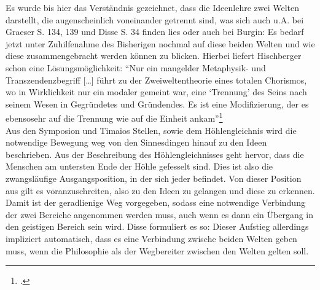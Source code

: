 Es wurde bis hier das Verständnis gezeichnet, dass die Ideenlehre zwei Welten darstellt, die augenscheinlich voneinander getrennt sind, was sich auch u.A. bei Graeser S. 134, 139 und Disse S. 34 finden lies oder auch bei Burgin: 
Es bedarf jetzt unter Zuhilfenahme des Bisherigen nochmal auf diese beiden Welten und wie diese zusammengebracht werden können zu blicken.
Hierbei liefert Hischberger schon eine Lösungsmöglichkeit:
\enquote{Nur ein mangelder Metaphysik- und Transzendenzbegriff [\dots] führt zu der Zweiweltentheorie eines totalen Chorismos, wo in Wirklichkeit nur ein modaler gemeint war, eine \enquote{Trennung} des Seins nach seinem Wesen in Gegründetes und Gründendes. Es ist eine Modifizierung, der es ebensosehr auf die Trennung wie auf die Einheit ankam}\footcite[][S. 96]{Hirschberger}\\
Aus den Symposion und Timaios Stellen, sowie dem Höhlengleichnis wird die notwendige Bewegung weg von den Sinnesdingen hinauf zu den Ideen beschrieben. Aus der Beschreibung des Höhlengleichnisses geht hervor, dass die Menschen am untersten Ende der Höhle gefesselt sind. Dies ist also die zwangsläufige Ausgangsposition, in der sich jeder befindet. Von dieser Position aus gilt es voranzuschreiten, also zu den Ideen zu gelangen und diese zu erkennen. Damit ist der geradlienige Weg vorgegeben, sodass eine notwendige Verbindung der zwei Bereiche angenommen werden muss, auch wenn es dann ein Übergang in den geistigen Bereich sein wird. 
Disse formuliert es so:  
Dieser Aufstieg allerdings impliziert automatisch, dass es eine Verbindung zwische beiden Welten geben muss, wenn die Philosophie als der Wegbereiter zwischen den Welten gelten soll.
